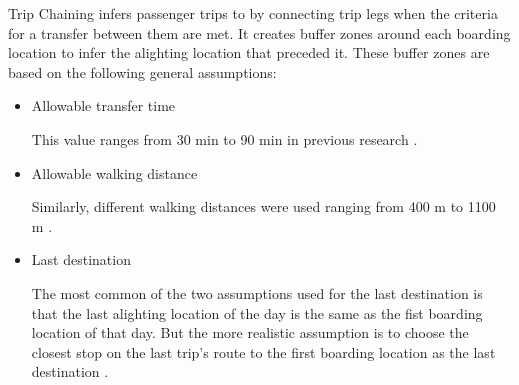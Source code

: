 \documentclass[11pt,twoside]{article}
\numberwithin{equation}{section}
\newcommand{\?}{\stackrel{?}{=}}
\begin{document}
Trip Chaining infers passenger trips to by connecting trip legs when the criteria for a transfer between them are met. It creates buffer zones around each boarding location to infer the alighting location that preceded it. These buffer zones are based on the following general assumptions\citep{alsgerValidatingImprovingPublic2016}:
\begin{itemize}

\item Allowable transfer time

This value ranges from 30 min to 90 min in previous research \citep{alsgerValidatingImprovingPublic2016}.


\item Allowable walking distance

Similarly, different walking distances were used ranging from 400 m to 1100 m \citep{alsgerValidatingImprovingPublic2016}.


\item Last destination 

The most common of the two assumptions used for the last destination is that the last alighting location of the day is the same as the fist boarding location of that day. But the more realistic assumption is to choose the closest stop on the last trip's route to the first boarding location as the last destination \citep{alsgerValidatingImprovingPublic2016}.










\end{itemize}


\end{document}

